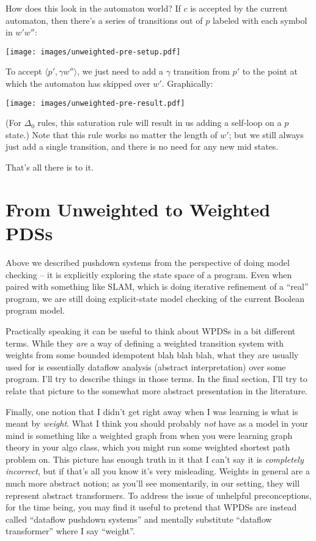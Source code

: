 \documentclass{article}
\newcommand{\Config}[2]{\ensuremath{\langle #1, #2 \rangle}}
\begin{document}
How does this look in the automaton world? If $c$ is accepted by the
current automaton, then there's a series of transitions out of $p$
labeled with each symbol in $w'w''$:
\begin{center}
  \texttt{[image: images/unweighted-pre-setup.pdf]}
\end{center}

To accept \Config{p'}{\gamma w''}, we just need to add a $\gamma$
transition from $p'$ to the point at which the automaton has skipped
over $w'$. Graphically:
\begin{center}
  \texttt{[image: images/unweighted-pre-result.pdf]}
\end{center}

(For $\Delta_0$ rules, this saturation rule will result in us adding a
self-loop on a $p$ state.)  Note that this rule works no matter the
length of $w'$; but we still always just add a single transition, and
there is no need for any new mid states.

That's all there is to it.


\section{From Unweighted to Weighted PDSs}

Above we described pushdown systems from the perspective of doing
model checking -- it is explicitly exploring the state space of a
program. Even when paired with something like SLAM, which is doing
iterative refinement of a ``real'' program, we are still doing
explicit-state model checking of the current Boolean program model.

Practically speaking it can be useful to think about WPDSs in a bit
different terms. While they \emph{are} a way of defining a weighted
transition system with weights from some bounded idempotent blah blah
blah, what they are usually used for is essentially dataflow analysis
(abstract interpretation) over some program. I'll try to describe
things in those terms. In the final section, I'll try to relate that
picture to the somewhat more abstract presentation in the literature.

Finally, one notion that I didn't get right away when I was learning
is what is meant by \emph{weight}. What I think you should probably
\emph{not} have as a model in your mind is something like a weighted
graph from when you were learning graph theory in your algo class,
which you might run some weighted shortest path problem on. This
picture has enough truth in it that I can't say it is \emph{completely
  incorrect}\footnotemark, but if that's all you know it's very
misleading. Weights in general are a much more abstract notion; as
you'll see momentarily, in our setting, they will represent abstract
transformers. To address the issue of unhelpful preconceptions, for
the time being, you may find it useful to pretend that WPDSs are
instead called ``dataflow pushdown systems'' and mentally substitute
``dataflow transformer'' where I say ``weight''.
\end{document}
